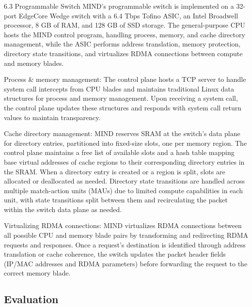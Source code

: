 6.3 Programmable Switch
MIND’s programmable switch is implemented on a 32-port EdgeCore Wedge switch with a 6.4 Tbps Tofino ASIC, an Intel Broadwell processor, 8 GB of RAM, and 128 GB of SSD storage. The general-purpose CPU hosts the MIND control program, handling process, memory, and cache directory management, while the ASIC performs address translation, memory protection, directory state transitions, and virtualizes RDMA connections between compute and memory blades.

Process \& memory management: The control plane hosts a TCP server to handle system call intercepts from CPU blades and maintains traditional Linux data structures for process and memory management. Upon receiving a system call, the control plane updates these structures and responds with system call return values to maintain transparency.

Cache directory management: MIND reserves SRAM at the switch’s data plane for directory entries, partitioned into fixed-size slots, one per memory region. The control plane maintains a free list of available slots and a hash table mapping base virtual addresses of cache regions to their corresponding directory entries in the SRAM. When a directory entry is created or a region is split, slots are allocated or deallocated as needed. Directory state transitions are handled across multiple match-action units (MAUs) due to limited compute capabilities in each unit, with state transitions split between them and recirculating the packet within the switch data plane as needed.

Virtualizing RDMA connections: MIND virtualizes RDMA connections between all possible CPU and memory blade pairs by transforming and redirecting RDMA requests and responses. Once a request’s destination is identified through address translation or cache coherence, the switch updates the packet header fields (IP/MAC addresses and RDMA parameters) before forwarding the request to the correct memory blade.


\subsection{Evaluation}
